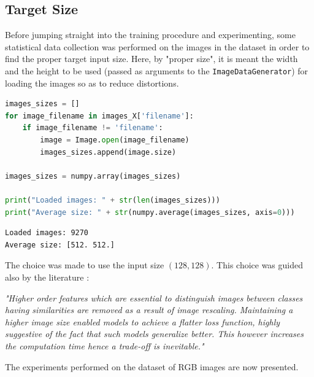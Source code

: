 \documentclass[11pt,a4paper]{article}
\begin{document}
\subsection{Target Size}
Before jumping straight into the training procedure and experimenting, some statistical data collection was performed on the images in the dataset in order to find the proper target input size. Here, by "proper size", it is meant the width and the height to be used (passed as arguments to the \texttt{ImageDataGenerator}) for loading the images so as to reduce distortions.
\begin{lstlisting}[language=Python,frame=single]
images_sizes = []
for image_filename in images_X['filename']:
    if image_filename != 'filename':
        image = Image.open(image_filename)
        images_sizes.append(image.size)

images_sizes = numpy.array(images_sizes)

print("Loaded images: " + str(len(images_sizes)))
print("Average size: " + str(numpy.average(images_sizes, axis=0)))
\end{lstlisting}
\begin{lstlisting}[language=bash,frame=single]
Loaded images: 9270
Average size: [512. 512.]
\end{lstlisting}
The choice was made to use the input size $(128, 128)$. This choice was guided also by the literature \cite{DBLP:journals/corr/abs-2101-11508} \cite{effectofimagesize}: 
\begin{displayquote}
\textit{"Higher order features which are essential to distinguish images between classes having similarities are removed as a result of image rescaling. Maintaining a  higher image  size enabled models to achieve a  flatter loss function, highly suggestive of the  fact  that  such  models  generalize  better. This however increases the computation time hence a trade-off is inevitable."}
\end{displayquote}
The experiments performed on the dataset of RGB images are now presented.
\end{document}
